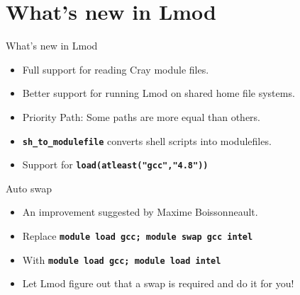 \documentclass{beamer}
\begin{document}



\section{What's new in Lmod}

\begin{frame}{What's new in Lmod}
  \begin{itemize}
      \item Full support for reading Cray module files.
      \item Better support for running Lmod on shared home file systems.
      \item Priority Path: Some paths are more equal than others.
      \item \texttt{\bf sh\_to\_modulefile} converts shell scripts into modulefiles.
      \item Support for \texttt{\bf load(atleast("gcc","4.8"))}
  \end{itemize}
\end{frame}

\begin{frame}{Auto swap}
  \begin{itemize}
      \item An improvement suggested by Maxime Boissonneault.
      \item Replace \texttt{\bf module load gcc; module swap gcc intel}
      \item With \texttt{\bf module load gcc; module load intel}
      \item Let Lmod figure out that a swap is required and do it for you!
  \end{itemize}
\end{frame}
\end{document}
